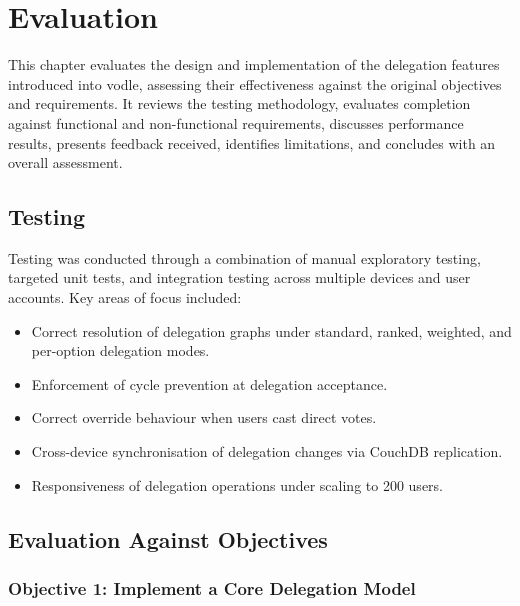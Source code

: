 \chapter{Evaluation}\label{ch:evaluation}

This chapter evaluates the design and implementation of the delegation features introduced into vodle, assessing their effectiveness against the original objectives and requirements. It reviews the testing methodology, evaluates completion against functional and non-functional requirements, discusses performance results, presents feedback received, identifies limitations, and concludes with an overall assessment.

\section{Testing}

Testing was conducted through a combination of manual exploratory testing, targeted unit tests, and integration testing across multiple devices and user accounts. Key areas of focus included:

\begin{itemize}
    \item Correct resolution of delegation graphs under standard, ranked, weighted, and per-option delegation modes.
    \item Enforcement of cycle prevention at delegation acceptance.
    \item Correct override behaviour when users cast direct votes.
    \item Cross-device synchronisation of delegation changes via CouchDB replication.
    \item Responsiveness of delegation operations under scaling to 200 users.
\end{itemize}

\section{Evaluation Against Objectives}

\subsection{Objective 1: Implement a Core Delegation Model}

